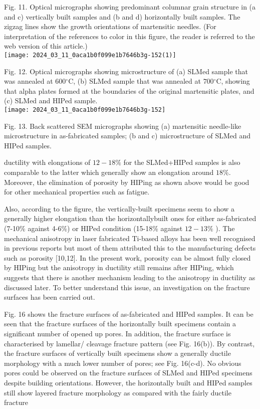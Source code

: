 \documentclass[10pt]{article}
\begin{document}
Fig. 11. Optical micrographs showing predominant columnar grain structure in (a and c) vertically built samples and (b and d) horizontally built samples. The zigzag lines show the growth orientations of martensitic needles. (For interpretation of the references to color in this figure, the reader is referred to the web version of this article.)\\
\texttt{[image: 2024\_03\_11\_0aca1b0f099e1b7646b3g-152(1)]}

Fig. 12. Optical micrographs showing microstructure of (a) SLMed sample that was annealed at $600{ }^{\circ} \mathrm{C}$, (b) SLMed sample that was annealed at $700{ }^{\circ} \mathrm{C}$, showing that alpha plates formed at the boundaries of the original martensitic plates, and (c) SLMed and HIPed sample.\\
\texttt{[image: 2024\_03\_11\_0aca1b0f099e1b7646b3g-152]}

Fig. 13. Back scattered SEM micrographs showing (a) martensitic needle-like microstructure in as-fabricated samples; (b and c) microstructure of SLMed and HIPed samples.

ductility with elongations of $12-18 \%$ for the SLMed+HIPed samples is also comparable to the latter which generally show an elongation around $18 \%$. Moreover, the elimination of porosity by HIPing as shown above would be good for other mechanical properties such as fatigue.

Also, according to the figure, the vertically-built specimens seem to show a generally higher elongation than the horizontallybuilt ones for either as-fabricated (7-10\% against 4-6\%) or HIPed condition (15-18\% against $12-13 \%$ ). The mechanical anisotropy in laser fabricated Ti-based alloys has been well recognised in previous reports but most of them attributed this to the manufacturing defects such as porosity [10,12]. In the present work, porosity can be almost fully closed by HIPing but the anisotropy in ductility still remains after HIPing, which suggests that there is another mechanism leading to the anisotropy in ductility as discussed later. To better understand this issue, an investigation on the fracture surfaces has been carried out.

Fig. 16 shows the fracture surfaces of as-fabricated and HIPed samples. It can be seen that the fracture surfaces of the horizontally built specimens contain a significant number of opened up pores. In addition, the fracture surface is characterised by lamellar/ cleavage fracture pattern (see Fig. 16(b)). By contrast, the fracture surfaces of vertically built specimens show a generally ductile morphology with a much lower number of pores; see Fig. 16(c-d). No obvious pores could be observed on the fracture surfaces of SLMed and HIPed specimens despite building orientations. However, the horizontally built and HIPed samples still show layered fracture morphology as compared with the fairly ductile fracture
\end{document}
